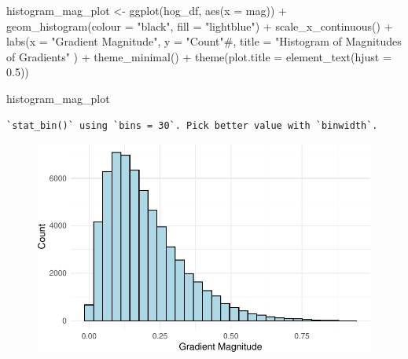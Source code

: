 \documentclass[
  letterpaper,
  DIV=11,
  numbers=noendperiod]{scrreprt}
\newenvironment{Shaded}{\begin{snugshade}}{\end{snugshade}}
\newcommand{\AttributeTok}[1]{\textcolor[rgb]{0.40,0.45,0.13}{#1}}
\newcommand{\CommentTok}[1]{\textcolor[rgb]{0.37,0.37,0.37}{#1}}
\newcommand{\FloatTok}[1]{\textcolor[rgb]{0.68,0.00,0.00}{#1}}
\newcommand{\FunctionTok}[1]{\textcolor[rgb]{0.28,0.35,0.67}{#1}}
\newcommand{\NormalTok}[1]{\textcolor[rgb]{0.00,0.23,0.31}{#1}}
\newcommand{\OtherTok}[1]{\textcolor[rgb]{0.00,0.23,0.31}{#1}}
\newcommand{\SpecialCharTok}[1]{\textcolor[rgb]{0.37,0.37,0.37}{#1}}
\newcommand{\StringTok}[1]{\textcolor[rgb]{0.13,0.47,0.30}{#1}}
\begin{document}
\begin{Shaded}
\begin{Highlighting}[]
\NormalTok{histogram\_mag\_plot }\OtherTok{\textless{}{-}}
  \FunctionTok{ggplot}\NormalTok{(hog\_df, }\FunctionTok{aes}\NormalTok{(}\AttributeTok{x =}\NormalTok{ mag)) }\SpecialCharTok{+}
  \FunctionTok{geom\_histogram}\NormalTok{(}\AttributeTok{colour =} \StringTok{"black"}\NormalTok{, }\AttributeTok{fill =} \StringTok{"lightblue"}\NormalTok{) }\SpecialCharTok{+}
  \FunctionTok{scale\_x\_continuous}\NormalTok{() }\SpecialCharTok{+} 
  \FunctionTok{labs}\NormalTok{(}\AttributeTok{x =} \StringTok{"Gradient Magnitude"}\NormalTok{, }\AttributeTok{y =} \StringTok{"Count"}\CommentTok{\#, title = "Histogram of Magnitudes of Gradients"}
\NormalTok{       ) }\SpecialCharTok{+}
  \FunctionTok{theme\_minimal}\NormalTok{() }\SpecialCharTok{+}
  \FunctionTok{theme}\NormalTok{(}\AttributeTok{plot.title =} \FunctionTok{element\_text}\NormalTok{(}\AttributeTok{hjust =} \FloatTok{0.5}\NormalTok{))}

\NormalTok{histogram\_mag\_plot}
\end{Highlighting}
\end{Shaded}

\begin{verbatim}
`stat_bin()` using `bins = 30`. Pick better value with `binwidth`.
\end{verbatim}

\begin{figure}[H]

{\centering \includegraphics{results_files/figure-pdf/unnamed-chunk-7-1.pdf}

}

\end{figure}
\end{document}
